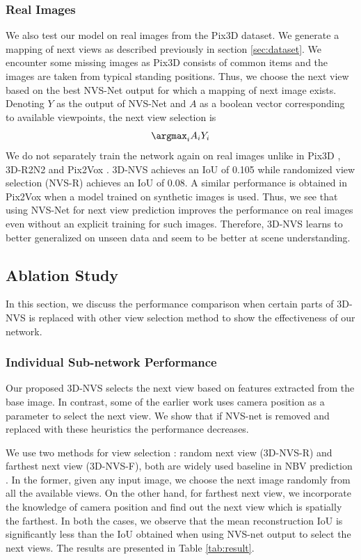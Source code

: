 \subsubsection{Real Images}
We also test our model on real images from the Pix3D dataset. We generate a mapping of next views as described previously in section \ref{sec:dataset}. We encounter some missing images as Pix3D consists of common items and the images are taken from typical standing positions. Thus, we choose the next view based on the best NVS-Net output for which a mapping of next image exists. Denoting $Y$ as the output of NVS-Net and $A$ as a boolean vector corresponding to available viewpoints, the next view selection is 
\begin{equation}
   \argmax_i A_i Y_i
\end{equation}
We do not separately train the network again on real images unlike in Pix3D \cite{pix3d}, 3D-R2N2 \cite{3dr2n2} and Pix2Vox \cite{pix2vox}. 3D-NVS achieves an IoU of 0.105 while randomized view selection (NVS-R) achieves an IoU of 0.08. A similar performance is obtained in Pix2Vox when a model trained on synthetic images is used. Thus, we see that using NVS-Net for next view prediction improves the performance on real images even without an explicit training for such images. Therefore, 3D-NVS learns to better generalized on unseen data and seem to be better at scene understanding.

\subsection{Ablation Study}
\label{sec:ablation}
In this section, we discuss the performance comparison when certain parts of 3D-NVS is replaced with other view selection method to show the effectiveness of our network. 
\subsubsection{Individual Sub-network Performance}
Our proposed 3D-NVS selects the next view based on features extracted from the base image. In contrast, some of the earlier work uses camera position as a parameter to select the next view. We show that if NVS-net is removed and replaced with these heuristics the performance decreases.

We use two methods for view selection : random next view (3D-NVS-R) and farthest next view (3D-NVS-F), both are widely used baseline in NBV prediction \cite{shapenet,yang2018active,delmerico2018comparison, hashim2019next, ly2019autonomous}. In the former, given any input image, we choose the next image randomly from all the available views. On the other hand, for farthest next view, we incorporate the knowledge of camera position and find out the next view which is spatially the farthest. In both the cases, we observe that the mean reconstruction IoU is significantly less than the IoU obtained when using NVS-net output to select the next views. The results are presented in Table \ref{tab:result}.

